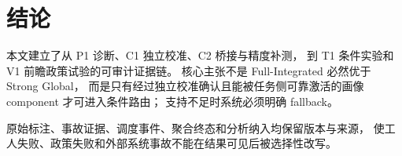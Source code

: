 \section{结论}

本文建立了从 P1 诊断、C1 独立校准、C2 桥接与精度补测，
到 T1 条件实验和 V1 前瞻政策试验的可审计证据链。
核心主张不是 Full-Integrated 必然优于 Strong Global，
而是只有经过独立校准确认且能被任务侧可靠激活的画像 component 才可进入条件路由；
支持不足时系统必须明确 fallback。

原始标注、事故证据、调度事件、聚合终态和分析纳入均保留版本与来源，
使工人失败、政策失败和外部系统事故不能在结果可见后被选择性改写。
